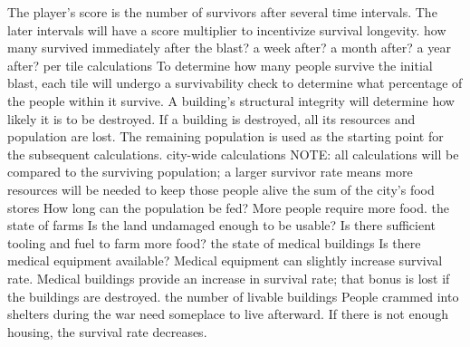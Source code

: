 \documentclass{article}
\begin{document}
\begin{outline}[enumerate]
  \1 The player's score is the number of survivors after several time
  intervals. The later intervals will have a score multiplier to incentivize
  survival longevity. 
    \2 how many survived immediately after the blast? 
    \2 a week after? 
    \2 a month after? 
    \2 a year after?
  \1 per tile calculations
    \2 To determine how many people survive the initial blast, each tile will
    undergo a survivability check to determine what percentage of the people
    within it survive.
      \3 A building's structural integrity will determine how likely it is to be
      destroyed.
      \3 If a building is destroyed, all its resources and population are lost.
    \2 The remaining population is used as the starting point for the subsequent
    calculations.
  \1 city-wide calculations
    \2 NOTE: all calculations will be compared to the surviving population; a
    larger survivor rate means more resources will be needed to keep those
    people alive
    \2 the sum of the city's food stores
      \3 How long can the population be fed?
      \3 More people require more food. 
    \2 the state of farms
      \3 Is the land undamaged enough to be usable?
      \3 Is there sufficient tooling and fuel to farm more food?
    \2 the state of medical buildings
      \3 Is there medical equipment available?
        \4 Medical equipment can slightly increase survival rate.
      \3 Medical buildings provide an increase in survival rate; that bonus is
      lost if the buildings are destroyed.
    \2 the number of livable buildings
      \3 People crammed into shelters during the war need someplace to live
      afterward.
      \3 If there is not enough housing, the survival rate decreases.
\end{outline}

\end{document}
